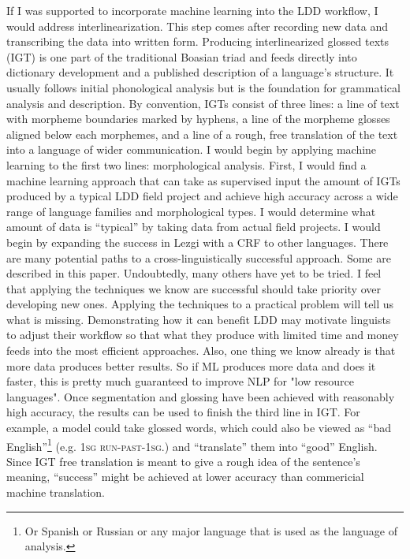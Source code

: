 \documentclass[12pt]{article}
\begin{document}
If I was supported to incorporate machine learning into the LDD workflow, I would address interlinearization. This step comes after recording new data and transcribing the data into written form. Producing interlinearized glossed texts (IGT) is one part of the traditional Boasian triad and feeds directly into dictionary development and a published description of a language's structure. It usually follows initial phonological analysis but is the foundation for grammatical analysis and description.  By convention, IGTs consist of three lines: a line of text with morpheme boundaries marked by hyphens, a line of the morpheme glosses aligned below each morphemes, and a line of a rough, free translation of the text into a language of wider communication. I would begin by applying machine learning to the first two lines: morphological analysis. First, I would find a machine learning approach that can take as supervised input the amount of IGTs produced by a typical LDD field project and achieve high accuracy across a wide range of language families and morphological types. I would determine what amount of data is ``typical'' by taking data from actual field projects. I would begin by expanding the success in Lezgi with a CRF \cite{moeller_automatic_2018} to other languages. There are many potential paths to a cross-linguistically successful approach. Some are described in this paper. Undoubtedly, many others have yet to be tried. I feel that applying the techniques we know are successful should take priority over developing new ones. Applying the techniques to a practical problem will tell us what is missing. Demonstrating how it can benefit LDD may motivate linguists to adjust their workflow so that what they produce with limited time and money feeds into the most efficient approaches. Also, one thing we know already is that more data produces better results. So if ML produces more data and does it faster, this is pretty much guaranteed to improve NLP for "low resource languages". 
Once segmentation and glossing have been achieved with reasonably high accuracy, the results can be used to finish the third line in IGT. For example, a model could take glossed words, which could also be viewed as ``bad English''\footnote{Or Spanish or Russian or any major language that is used as the language of analysis.} (e.g. \textsc{1sg run-past-1sg.}) and ``translate'' them into ``good'' English. Since IGT free translation is meant to give a rough idea of the sentence's meaning, ``success'' might be achieved at lower accuracy than commericial machine translation.
\end{document}
